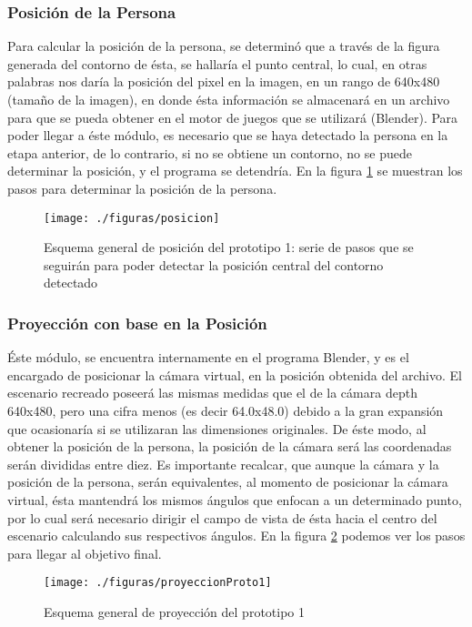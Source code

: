 \documentclass[a4paper,openright,12pt]{report}
\begin{document}
\subsubsection{Posición de la Persona}
Para calcular la posición de la persona, se determinó que a través de la figura generada del contorno de ésta, se hallaría el punto central, lo cual, en otras palabras nos daría la posición del pixel en la imagen, en un rango de 640x480 (tamaño de la imagen), en donde ésta información se almacenará en un archivo para que se pueda obtener en el motor de juegos que se utilizará (Blender). Para poder llegar a éste módulo, es necesario que se haya detectado la persona en la etapa anterior, de lo contrario, si no se obtiene un contorno, no se puede determinar la posición, y el programa se detendría. En la figura \ref{fig:posicion} se muestran los pasos para determinar la posición de la persona.
\begin{figure}[th]
	\centering
	\texttt{[image: ./figuras/posicion]}
	\caption[Esquema general de posición del prototipo 1]{Esquema general de posición del prototipo 1: serie de pasos que se seguirán para poder detectar la posición central del contorno detectado} \label{fig:posicion}
\end{figure}
\subsubsection{Proyección con base en la Posición}
Éste módulo, se encuentra internamente en el programa Blender, y es el encargado de posicionar la cámara virtual, en la posición obtenida del archivo. El escenario recreado poseerá las mismas medidas que el de la cámara depth 640x480, pero una cifra menos (es decir 64.0x48.0) debido a la gran expansión que ocasionaría si se utilizaran las dimensiones originales. De éste modo, al obtener la posición de la persona, la posición de la cámara será las coordenadas serán divididas entre diez. Es importante recalcar, que aunque la cámara y la posición de la persona, serán equivalentes, al momento de posicionar la cámara virtual, ésta mantendrá los mismos ángulos que enfocan a un determinado punto, por lo cual será necesario dirigir el campo de vista de ésta hacia el centro del escenario calculando sus respectivos ángulos. En la figura \ref{fig:proyeccionProto1}  podemos ver los pasos para llegar al objetivo final.
\begin{figure}[th]
	\centering
	\texttt{[image: ./figuras/proyeccionProto1]}
	\caption{Esquema general de proyección del prototipo 1} \label{fig:proyeccionProto1}
\end{figure}
\end{document}
